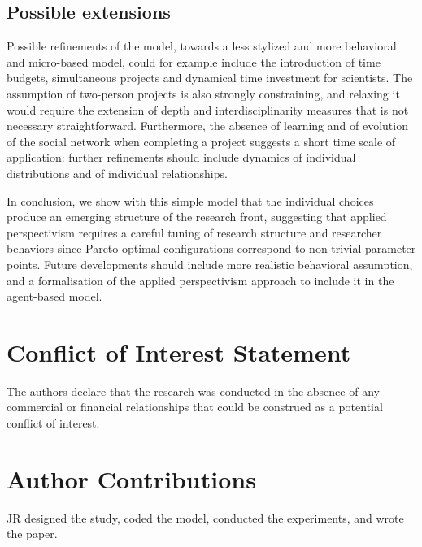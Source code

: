 \documentclass[utf8]{frontiersFPHY} %
\begin{document}
\subsection{Possible extensions}

Possible refinements of the model, towards a less stylized and more behavioral and micro-based model, could for example include the introduction of time budgets, simultaneous projects and dynamical time investment for scientists. The assumption of two-person projects is also strongly constraining, and relaxing it would require the extension of depth and interdisciplinarity measures that is not necessary straightforward. Furthermore, the absence of learning and of evolution of the social network when completing a project suggests a short time scale of application: further refinements should include dynamics of individual distributions and of individual relationships.


\bigskip

In conclusion, we show with this simple model that the individual choices produce an emerging structure of the research front, suggesting that applied perspectivism requires a careful tuning of research structure and researcher behaviors since Pareto-optimal configurations correspond to non-trivial parameter points. Future developments should include more realistic behavioral assumption, and a formalisation of the applied perspectivism approach to include it in the agent-based model.





\section*{Conflict of Interest Statement}

The authors declare that the research was conducted in the absence of any commercial or financial relationships that could be construed as a potential conflict of interest.

\section*{Author Contributions}

JR designed the study, coded the model, conducted the experiments, and wrote the paper.
\end{document}
